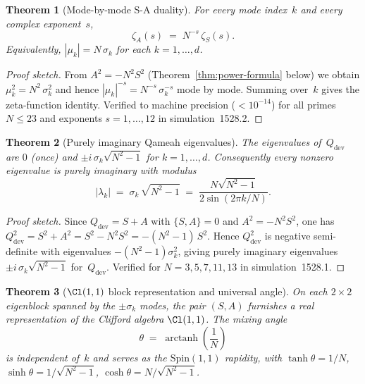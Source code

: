 \documentclass[aps,prd,twocolumn,superscriptaddress,floatfix,nofootinbib]{revtex4-2}
\newtheorem{theorem}{Theorem}
\theoremstyle{definition}
\theoremstyle{remark}
\begin{document}
\begin{theorem}[Mode-by-mode S-A duality]%
  \label{thm:SA-duality}
For every mode index~$k$ and every complex exponent~$s$,
\[
  \zeta_A(s) \;=\; N^{-s}\,\zeta_S(s).
\]
Equivalently, $|\mu_k| = N\,\sigma_k$ for each $k = 1,\ldots,d$.
\end{theorem}

\begin{proof}[Proof sketch]
From $A^2 = -N^2 S^2$ (Theorem~\ref{thm:power-formula} below)
we obtain $\mu_k^2 = N^2\,\sigma_k^2$ and hence
$|\mu_k|^{-s} = N^{-s}\,\sigma_k^{-s}$ mode by mode.
Summing over~$k$ gives the zeta-function identity.
Verified to machine precision ($<10^{-14}$) for all primes
$N \le 23$ and exponents $s = 1,\ldots,12$ in simulation~1528.2.
\end{proof}

\begin{theorem}[Purely imaginary Qameah eigenvalues]%
  \label{thm:Q-imag-eig}
The eigenvalues of~$Q_{\mathrm{dev}}$ are $0$ (once) and
$\pm i\,\sigma_k\sqrt{N^2-1}$ for $k = 1,\ldots,d$.
Consequently every nonzero eigenvalue is purely imaginary with modulus
\[
  |\lambda_k| \;=\; \sigma_k\,\sqrt{N^2 - 1}
  \;=\; \frac{N\sqrt{N^2-1}}{2\sin(2\pi k/N)}.
\]
\end{theorem}

\begin{proof}[Proof sketch]
Since $Q_{\mathrm{dev}} = S + A$ with $\{S,A\} = 0$ and
$A^2 = -N^2 S^2$, one has $Q_{\mathrm{dev}}^2 = S^2 + A^2
= S^2 - N^2 S^2 = -(N^2 - 1)\,S^2$.
Hence $Q_{\mathrm{dev}}^2$ is negative semi-definite with eigenvalues
$-(N^2-1)\sigma_k^2$, giving purely imaginary eigenvalues
$\pm i\,\sigma_k\sqrt{N^2-1}$ for~$Q_{\mathrm{dev}}$.
Verified for $N = 3,5,7,11,13$ in simulation~1528.1.
\end{proof}

\begin{theorem}[$\Cl(1,1)$ block representation and universal angle]%
  \label{thm:Cl11-angle}
On each $2\times 2$ eigenblock spanned by the $\pm\sigma_k$ modes,
the pair $(S,A)$ furnishes a real representation of the Clifford
algebra $\Cl(1,1)$.  The mixing angle
\[
  \theta \;=\; \operatorname{arctanh}\!\left(\frac{1}{N}\right)
\]
is independent of~$k$ and serves as the $\mathrm{Spin}(1,1)$ rapidity,
with $\tanh\theta = 1/N$, $\sinh\theta = 1/\sqrt{N^2-1}$,
$\cosh\theta = N/\sqrt{N^2-1}$.
\end{theorem}
\end{document}
